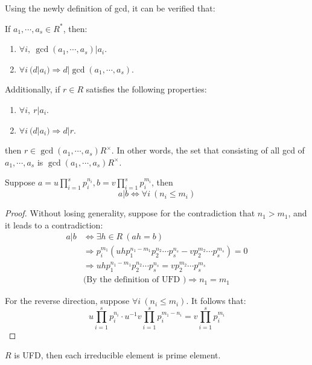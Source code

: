 Using the newly definition of gcd, it can be verified that:
\begin{proposition}
    If $a_1 , \cdots, a_s \in R^*$, then:
    \begin{enumerate}
        \item $\forall i,\ \gcd(a_1, \cdots, a_s) | a_i$.
        \item $\forall i \ (d | a_i) \Rightarrow d | \gcd(a_1, \cdots, a_s)$.
    \end{enumerate}
    Additionally, if $r \in R$ satisfies the following properties:
    \begin{enumerate}
        \item $\forall i,\ r | a_i$.
        \item $\forall i \ (d | a_i) \Rightarrow d | r$.
    \end{enumerate}
    then $r \in \gcd(a_1, \cdots, a_s) R^{\times}$. In other words, the set that consisting of all gcd of $a_1, \cdots, a_s$ is $\gcd(a_1, \cdots, a_s) R^{\times}$.
\end{proposition}





\begin{corollary}
    Suppose $a = u \prod_{i=1}^s p_i^{n_i}, b = v \prod_{i=1}^{s} p_i^{m_i}$, then
    \[
        a | b \Leftrightarrow \forall i\ ( n_i \leq m_i) 
    \]
\end{corollary}
\begin{proof}
    Without losing generality, suppose for the contradiction that $n_1 > m_1$, and it leads to a contradiction:
    \begin{align*}
        a | b &\Leftrightarrow \exists h \in R\ (ah = b) \\
        & \Rightarrow p_{i}^{m_1} \left( u h p_1^{n_1 - m_1} p_2^{n_2} \cdots p_s^{n_s} - v p_2^{m_2} \cdots p_s^{m_s} \right) = 0\\
        &\Rightarrow u h p_1^{n_1 - m_1} p_2^{n_2} \cdots p_s^{n_s} =  v p_2^{m_2} \cdots p_s^{m_s} \\
        & \text{(By the definition of UFD )} \Rightarrow n_1 = m_1
    \end{align*}

    For the reverse direction, suppose $\forall i \ (n_i \leq m_i)$. It follows that:
    \[
        u \prod_{i=1}^s p_i^{n_i} \cdot u^{-1} v \prod_{i=1}^s p_{i}^{m_1 - n_i} = v \prod_{i=1}^{s} p_i^{m_i}
    \]
\end{proof}


\begin{proposition}
    $R$ is UFD, then each irreducible element is prime element.
\end{proposition}







